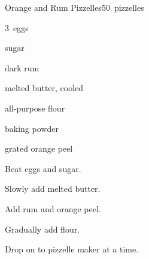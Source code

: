 \begin{recipe}{Orange and Rum Pizzelles}{}{50~pizzelles}

\begin{ingredients}
\item 3~eggs
\item {} sugar
\item {} dark rum
\item \C{\half} melted butter, cooled
\item {} all-purpose flour
\item {} baking powder
\item {} grated orange peel
\end{ingredients}

\begin{directions}
\item Beat eggs and sugar.
\item Slowly add melted butter.
\item Add rum and orange peel.
\item Gradually add flour.
\item Drop on to pizzelle maker  at a time.
\end{directions}

\end{recipe}
